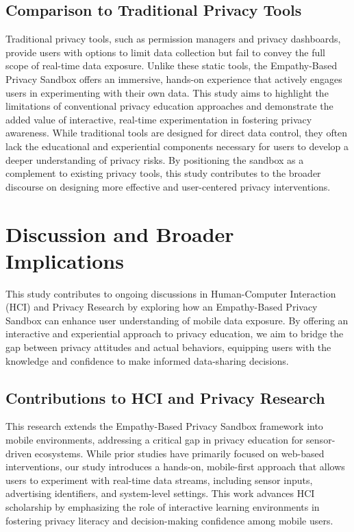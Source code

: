 \documentclass[acmlarge, nonacm]{acmart}
\begin{document}
\subsection{Comparison to Traditional Privacy Tools}
Traditional privacy tools, such as permission managers and privacy dashboards, provide users with options to limit data collection but fail to convey the full scope of real-time data exposure. Unlike these static tools, the Empathy-Based Privacy Sandbox offers an immersive, hands-on experience that actively engages users in experimenting with their own data. This study aims to highlight the limitations of conventional privacy education approaches and demonstrate the added value of interactive, real-time experimentation in fostering privacy awareness. While traditional tools are designed for direct data control, they often lack the educational and experiential components necessary for users to develop a deeper understanding of privacy risks. By positioning the sandbox as a complement to existing privacy tools, this study contributes to the broader discourse on designing more effective and user-centered privacy interventions.

\section{Discussion and Broader Implications}

This study contributes to ongoing discussions in Human-Computer Interaction (HCI) and Privacy Research by exploring how an Empathy-Based Privacy Sandbox can enhance user understanding of mobile data exposure. By offering an interactive and experiential approach to privacy education, we aim to bridge the gap between privacy attitudes and actual behaviors, equipping users with the knowledge and confidence to make informed data-sharing decisions.

\subsection{Contributions to HCI and Privacy Research}

This research extends the Empathy-Based Privacy Sandbox framework into mobile environments, addressing a critical gap in privacy education for sensor-driven ecosystems. While prior studies have primarily focused on web-based interventions, our study introduces a hands-on, mobile-first approach that allows users to experiment with real-time data streams, including sensor inputs, advertising identifiers, and system-level settings. This work advances HCI scholarship by emphasizing the role of interactive learning environments in fostering privacy literacy and decision-making confidence among mobile users.
\end{document}
